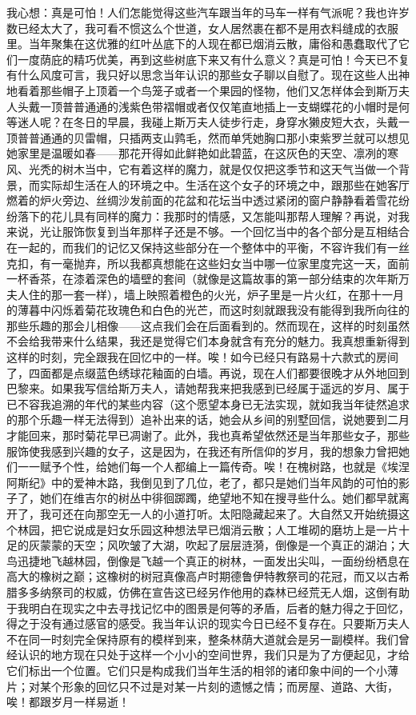 \par 我心想：真是可怕！人们怎能觉得这些汽车跟当年的马车一样有气派呢？我也许岁数已经太大了，我可看不惯这么个世道，女人居然裹在都不是用衣料缝成的衣服里。当年聚集在这优雅的红叶丛底下的人现在都已烟消云散，庸俗和愚蠢取代了它们一度荫庇的精巧优美，再到这些树底下来又有什么意义？真是可怕！今天已不复有什么风度可言，我只好以思念当年认识的那些女子聊以自慰了。现在这些人出神地看着那些帽子上顶着一个鸟笼子或者一个果园的怪物，他们又怎样体会到斯万夫人头戴一顶普普通通的浅紫色带褶帽或者仅仅笔直地插上一支蝴蝶花的小帽时是何等迷人呢？在冬日的早晨，我碰上斯万夫人徒步行走，身穿水獭皮短大衣，头戴一顶普普通通的贝雷帽，只插两支山鹑毛，然而单凭她胸口那小束紫罗兰就可以想见她家里是温暖如春——那花开得如此鲜艳如此碧蓝，在这灰色的天空、凛冽的寒风、光秃的树木当中，它有着这样的魔力，就是仅仅把这季节和这天气当做一个背景，而实际却生活在人的环境之中。生活在这个女子的环境之中，跟那些在她客厅燃着的炉火旁边、丝绸沙发前面的花盆和花坛当中透过紧闭的窗户静静看着雪花纷纷落下的花儿具有同样的魔力：我那时的情感，又怎能叫那帮人理解？再说，对我来说，光让服饰恢复到当年那样子还是不够。一个回忆当中的各个部分是互相结合在一起的，而我们的记忆又保持这些部分在一个整体中的平衡，不容许我们有一丝克扣，有一毫抛弃，所以我都真想能在这些妇女当中哪一位家里度完这一天，面前一杯香茶，在漆着深色的墙壁的套间（就像是这篇故事的第一部分结束的次年斯万夫人住的那一套一样），墙上映照着橙色的火光，炉子里是一片火红，在那十一月的薄暮中闪烁着菊花玫瑰色和白色的光芒，而这时刻就跟我没有能得到我所向往的那些乐趣的那会儿相像——这点我们会在后面看到的。然而现在，这样的时刻虽然不会给我带来什么结果，我还是觉得它们本身就含有充分的魅力。我真想重新得到这样的时刻，完全跟我在回忆中的一样。唉！如今已经只有路易十六款式的房间了，四面都是点缀蓝色绣球花釉面的白墙。再说，现在人们都要很晚才从外地回到巴黎来。如果我写信给斯万夫人，请她帮我来把我感到已经属于遥远的岁月、属于已不容我追溯的年代的某些内容（这个愿望本身已无法实现，就如我当年徒然追求的那个乐趣一样无法得到）追补出来的话，她会从乡间的别墅回信，说她要到二月才能回来，那时菊花早已凋谢了。此外，我也真希望依然还是当年那些女子，那些服饰使我感到兴趣的女子，这是因为，在我还有所信仰的岁月，我的想象力曾把她们一一赋予个性，给她们每一个人都编上一篇传奇。唉！在槐树路，也就是《埃涅阿斯纪》中的爱神木路，我倒见到了几位，老了，都只是她们当年风韵的可怕的影子了，她们在维吉尔的树丛中徘徊踯躅，绝望地不知在搜寻些什么。她们都早就离开了，我可还在向那空无一人的小道打听。太阳隐藏起来了。大自然又开始统摄这个林园，把它说成是妇女乐园这种想法早已烟消云散；人工堆砌的磨坊上是一片十足的灰蒙蒙的天空；风吹皱了大湖，吹起了层层涟漪，倒像是一个真正的湖泊；大鸟迅捷地飞越林园，倒像是飞越一个真正的树林，一面发出尖叫，一面纷纷栖息在高大的橡树之巅；这橡树的树冠真像高卢时期德鲁伊特教祭司的花冠，而又以古希腊多多纳祭司的权威，仿佛在宣告这已经另作他用的森林已经荒无人烟，这倒有助于我明白在现实之中去寻找记忆中的图景是何等的矛盾，后者的魅力得之于回忆，得之于没有通过感官的感受。我当年认识的现实今日已经不复存在。只要斯万夫人不在同一时刻完全保持原有的模样到来，整条林荫大道就会是另一副模样。我们曾经认识的地方现在只处于这样一个小小的空间世界，我们只是为了方便起见，才给它们标出一个位置。它们只是构成我们当年生活的相邻的诸印象中间的一个小薄片；对某个形象的回忆只不过是对某一片刻的遗憾之情；而房屋、道路、大街，唉！都跟岁月一样易逝！


